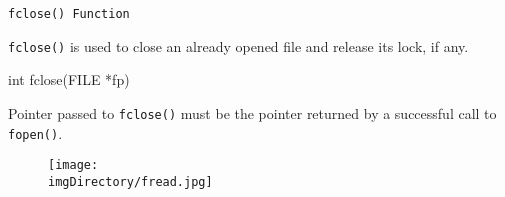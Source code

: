 \documentclass[compress]{beamer}
\begin{document}
\begin{slide}
	\begin{block}{\texttt{fclose() Function}}

	\texttt{fclose()} is used to close an already opened file and release its lock, if any.

	\begin{terminal}
	int fclose(FILE *fp)
	\end{terminal}

	Pointer passed to \texttt{fclose()} must be the pointer returned by a successful call to \texttt{fopen()}.

	\end{block}
\end{slide}

\begin{slide}
	\begin{figure}
	\texttt{[image: \\imgDirectory/fread.jpg]}
	\end{figure}
\end{slide}
\end{document}
